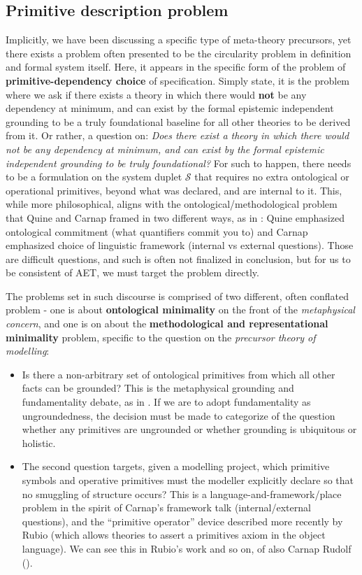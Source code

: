 \subsection{Primitive description problem}\label{subsec:primordial}

Implicitly, we have been discussing a specific type of meta-theory precursors, yet there exists a problem often presented to be the circularity problem in definition and formal system itself. Here, it appears in the specific form of the problem of \textbf{primitive-dependency choice} of specification. Simply state, it is the problem where we ask if there exists a theory in which there would \textbf{not} be any dependency at minimum, and can exist by the formal epistemic independent grounding to be a truly foundational baseline for all other theories to be derived from it. Or rather, a question on: \textit{Does there exist a theory in which there would not be any dependency at minimum, and can exist by the formal epistemic independent grounding to be truly foundational?} For such to happen, there needs to be a formulation on the system duplet $\mathcal{S}$ that requires no extra ontological or operational primitives, beyond what was declared, and are internal to it. This, while more philosophical, aligns with the ontological/methodological problem that Quine and Carnap framed in two different ways, as in \cite{quine1948,carnap1950}: Quine emphasized ontological commitment (what quantifiers commit you to) and Carnap emphasized choice of linguistic framework (internal vs external questions). Those are difficult questions, and such is often not finalized in conclusion, but for us to be consistent of AET, we must target the problem directly. 

The problems set in such discourse is comprised of two different, often conflated problem - one is about \textbf{ontological minimality} on the front of the \textit{metaphysical concern}, and one is on about the \textbf{methodological and representational minimality} problem, specific to the question on the \textit{precursor theory of modelling}:
\begin{itemize}[topsep=1pt,itemsep=1pt]
	\item Is there a non-arbitrary set of ontological primitives from which all other facts can be grounded? This is the metaphysical grounding and fundamentality debate, as in \cite{schaffer2009,bliss2014}. If we are to adopt fundamentality as ungroundedness, the decision must be made to categorize of the question whether any primitives are ungrounded or whether grounding is ubiquitous or holistic. 
	\item The second question targets, given a modelling project, which primitive symbols and operative primitives must the modeller explicitly declare so that no smuggling of structure occurs? This is a language-and-framework/place problem in the spirit of Carnap's framework talk (internal/external questions), and the “primitive operator” device described more recently by Rubio (which allows theories to assert a primitives axiom in the object language). We can see this in Rubio's work \cite{rubio2022} and so on, of also Carnap Rudolf (\cite{carnap1950}).  
\end{itemize}

